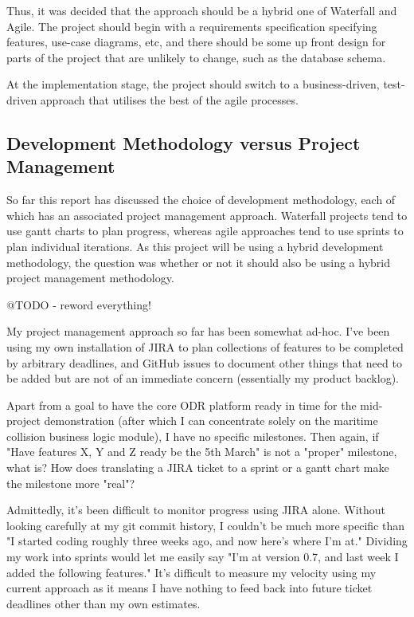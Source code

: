 Thus, it was decided that the approach should be a hybrid one of Waterfall and Agile. The project should begin with a requirements specification specifying features, use-case diagrams, etc, and there should be some up front design for parts of the project that are unlikely to change, such as the database schema.

At the implementation stage, the project should switch to a business-driven, test-driven approach that utilises the best of the agile processes.

\subsection{Development Methodology versus Project Management}

So far this report has discussed the choice of development methodology, each of which has an associated project management approach. Waterfall projects tend to use gantt charts to plan progress, whereas agile approaches tend to use sprints to plan individual iterations. As this project will be using a hybrid development methodology, the question was whether or not it should also be using a hybrid project management methodology.

@TODO - reword everything!

My project management approach so far has been somewhat ad-hoc. I've been using my own installation of JIRA to plan collections of features to be completed by arbitrary deadlines, and GitHub issues to document other things that need to be added but are not of an immediate concern (essentially my product backlog).

Apart from a goal to have the core ODR platform ready in time for the mid-project demonstration (after which I can concentrate solely on the maritime collision business logic module), I have no specific milestones. Then again, if "Have features X, Y and Z ready be the 5th March" is not a "proper" milestone, what is? How does translating a JIRA ticket to a sprint or a gantt chart make the milestone more "real"?

Admittedly, it's been difficult to monitor progress using JIRA alone. Without looking carefully at my git commit history, I couldn't be much more specific than "I started coding roughly three weeks ago, and now here's where I'm at." Dividing my work into sprints would let me easily say "I'm at version 0.7, and last week I added the following features." It's difficult to measure my velocity using my current approach as it means I have nothing to feed back into future ticket deadlines other than my own estimates.


